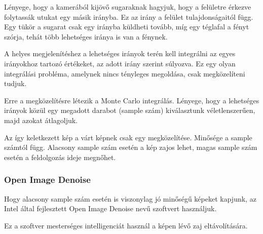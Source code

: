 Lényege, hogy a kamerából kijövő sugaraknak hagyjuk, hogy a felületre érkezve folytassák utukat egy másik irányba. Ez az irány a felület tulajdonságaitól függ. Egy tükör a sugarat csak egy irányba küldheti tovább, míg egy téglafal a fényt szórja, tehát több lehetséges iránya is van a fénynek. 

A helyes megjelenítéshez a lehetséges irányok terén kell integrálni az egyes irányokhoz tartozó értékeket, az adott irány szerint súlyozva. Ez egy olyan integrálási probléma, amelynek nincs tényleges megoldása, csak megközelíteni tudjuk.

Erre a megközelítésre létezik a Monte Carlo integrálás. Lényege, hogy a lehetséges irányok közül egy megadott darabot (sample szám) kiválasztunk véletlenszerűen, majd azokat átlagoljuk.

Az így keletkezett kép a várt képnek csak egy megközelítése. Minősége a sample számtól függ. Alacsony sample szám esetén a kép zajos lehet, magas sample szám esetén a feldolgozás ideje megnőhet.

\subsubsection{Open Image Denoise}
Hogy alacsony sample szám esetén is viszonylag jó minőségű képeket kapjunk, az Intel által fejlesztett Open Image Denoise nevű szoftvert használjuk. 

Ez a szoftver mesterséges intelligenciát használ a képen lévő zaj eltávolítására.


